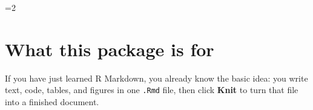 \documentclass[12pt]{article}
\newif\ifhfwghfwg
\newif\ifhfwganon
\newcommand{\hfwgmaincolumns}{1}
\begin{document}
\begin{multicols}{2}
\setlength{\columnsep}{0.24in}
\raggedcolumns
\footnotesize
{}
\setlength{\parindent}{0.85em}
\setlength{\parskip}{0pt}
\titleformat{\section}{\normalsize\bfseries\color{hfwgaccent}}{}{0pt}{}
\titleformat{\subsection}{\footnotesize\bfseries}{}{0pt}{}
\titlespacing{\section}{0pt}{0.5em}{0.14em}
\titlespacing{\subsection}{0pt}{0.38em}{0.1em}
\par\vspace{0.45em}
\else
\clearpage
\fi
\setcounter{page}{1}


\ifhfwghfwg\else
\ifnum\hfwgmaincolumns=2\relax
  \twocolumn
\fi
\fi

\ifhfwganon
\begingroup
\small
\noindent\textit{This manuscript is set to anonymous mode. Identifying metadata fields are suppressed on the title page.}\par
\endgroup
\vspace{1em}
\fi

\section{What this package is for}\label{what-this-package-is-for}

If you have just learned R Markdown, you already know the basic idea:
you write text, code, tables, and figures in one \texttt{.Rmd} file,
then click \textbf{Knit} to turn that file into a finished document.


\end{multicols}
\end{document}
